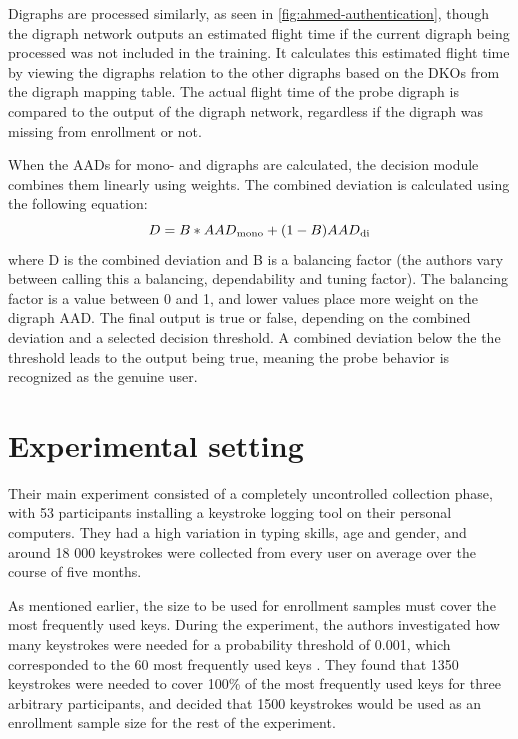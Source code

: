 \documentclass[informationsecurity]{gucmasterproject}
\begin{document}
Digraphs are processed similarly, as seen in \cref{fig:ahmed-authentication}, though the digraph network outputs an estimated flight time if the current digraph being processed was not included in the training.
It calculates this estimated flight time by viewing the digraphs relation to the other digraphs based on the DKOs from the digraph mapping table.
The actual flight time of the probe digraph is compared to the output of the digraph network, regardless if the digraph was missing from enrollment or not.

When the AADs for mono- and digraphs are calculated, the decision module combines them linearly using weights.
The combined deviation is calculated using the following equation:
\begin{equation}
D = B * AAD\textsubscript{mono} + (1-B)AAD\textsubscript{di}
\end{equation}
where D is the combined deviation and B is a balancing factor (the authors vary between calling this a balancing, dependability and tuning factor).
The balancing factor is a value between 0 and 1, and lower values place more weight on the digraph AAD.
The final output is true or false, depending on the combined deviation and a selected decision threshold.
A combined deviation below the the threshold leads to the output being true, meaning the probe behavior is recognized as the genuine user.

\section{Experimental setting}
\label{sec:ahmed-experimental}
Their main experiment consisted of a completely uncontrolled collection phase, with 53 participants installing a keystroke logging tool on their personal computers.
They had a high variation in typing skills, age and gender, and around 18 000 keystrokes were collected from every user on average over the course of five months.

As mentioned earlier, the size to be used for enrollment samples must cover the most frequently used keys.
During the experiment, the authors investigated how many keystrokes were needed for a probability threshold of 0.001, which corresponded to the 60 most frequently used keys \cite{Ahmed}.
They found that 1350 keystrokes were needed to cover 100\% of the most frequently used keys for three arbitrary participants, and decided that 1500 keystrokes would be used as an enrollment sample size for the rest of the experiment.
\end{document}
